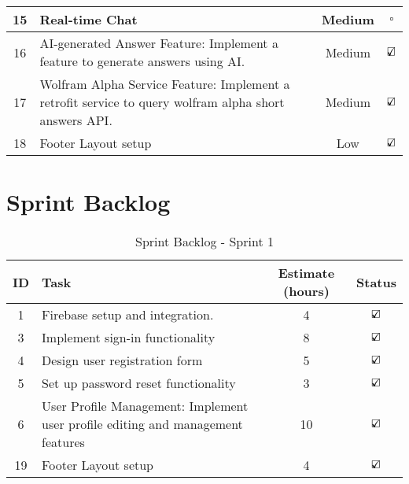 \begin{longtable}{|c|p{7cm}|c|c|}
    \hline
    15 & Real-time Chat & Medium & $\square$\\
    \hline
    16 & AI-generated Answer Feature: Implement a feature to generate answers using AI. & Medium & $\text{\rlap{$\checkmark$}}\square$\\
    \hline
    17 & Wolfram Alpha Service Feature: Implement a retrofit service to query wolfram alpha short answers API. & Medium & $\text{\rlap{$\checkmark$}}\square$\\
    \hline
    18 & Footer Layout setup & Low & $\text{\rlap{$\checkmark$}}\square$\\
    \hline
\end{longtable}



\section{Sprint Backlog}\label{sprint_backlog}

\begin{table}[H]
    \centering
    \caption*{Sprint Backlog - Sprint 1}
    \begin{tabular}{|c|p{5cm}|c|c|}
        \hline
        \textbf{ID} & \textbf{Task} & \textbf{Estimate (hours)} & \textbf{Status} \\
        \hline
        1 & Firebase setup and integration. & 4 & $\text{\rlap{$\checkmark$}}\square$\\
        \hline
        3 & Implement sign-in functionality & 8 & $\text{\rlap{$\checkmark$}}\square$\\
        \hline
        4 & Design user registration form & 5 & $\text{\rlap{$\checkmark$}}\square$\\
        \hline
        5 & Set up password reset functionality & 3 & $\text{\rlap{$\checkmark$}}\square$\\
        \hline
        6 & User Profile Management: Implement user profile editing and management features & 10 & $\text{\rlap{$\checkmark$}}\square$\\
        \hline
        19 & Footer Layout setup & 4 & $\text{\rlap{$\checkmark$}}\square$\\
        \hline
    \end{tabular}
\end{table}


